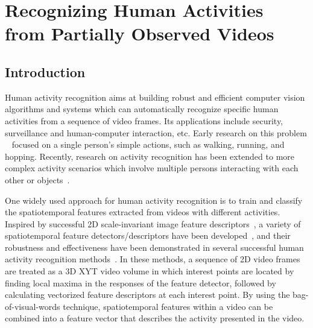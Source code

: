 \chapter{Recognizing Human Activities from Partially Observed Videos}

\section{Introduction}
Human activity recognition aims at building robust and efficient computer
vision algorithms and systems which can automatically recognize specific human
activities from a sequence of video frames. Its applications include security,
surveillance and human-computer interaction, etc.  Early research on this
problem
~\cite{ActionsAsSpaceTimeShapes_iccv05,DollarVSPETS05cuboids,lifeifei2008,STIP2008,christian2004}
focused on a single person's simple actions, such as walking, running, and
hopping. Recently, research on activity recognition has been extended to more
complex activity scenarios which involve multiple persons interacting with each
other or objects~\cite{Ryoo2009,Waltisberg_variationsof,Tsz-Ho2010}.

One widely used approach for human activity recognition is to train and
classify the spatiotemporal features extracted from videos with different
activities. Inspired by successful 2D scale-invariant image feature
descriptors~\cite{SIFT2004,HOG2005}, a variety of spatiotemporal feature
detectors/descriptors have been
developed~\cite{STIP2008,DollarVSPETS05cuboids,Jhuang07abiologically,Laptev03space-timeinterest,GeertECCV2008,Shu-FaiICCV2007},
and their robustness and {\color{black}effectiveness} have been demonstrated in
several successful human activity recognition
methods~\cite{DollarVSPETS05cuboids,lifeifei2008,STIP2008,christian2004,Ryoo2009,Ryoo2011,Waltisberg_variationsof,Klaser_aspatio-temporal,Scovanner07icm}.
In these methods, a sequence of 2D video frames are treated as a 3D XYT video
volume {\color{black} in which} interest points are located by finding local
maxima in the responses of the feature detector, followed by calculating
vectorized feature descriptors at each interest point.  By using the
bag-of-visual-words technique, spatiotemporal features within a video can be
combined into a feature vector that describes the activity
{\color{black}presented} in the video.

